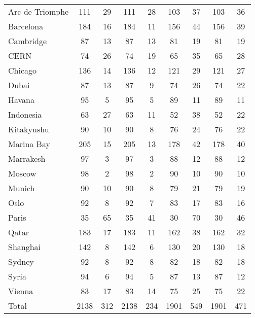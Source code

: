 \begin{table}[H]
\begin{adjustbox}{width=1\textwidth}
\begin{tabular}{|l|c|c|c|c|c|c|c|c|}
         Arc de Triomphe & 111  &  29  &  111  &  28  &  103  &  37  &  103  &  36  \\
    Barcelona       & 184  &  16  &  184  &  11  &  156  &  44  &  156  &  39  \\
    Cambridge       & 87  &  13  &  87  &  13  &  81  &  19  &  81  &  19  \\
    CERN            & 74  &  26  &  74  &  19  &  65  &  35  &  65  &  28  \\
    Chicago         & 136  &  14  &  136  &  12  &  121  &  29  &  121  &  27  \\ 
    Dubai           & 87  &  13  &  87  &  9  &  74  &  26  &  74  &  22  \\ 
    Havana          & 95  &  5  &  95  &  5  &  89  &  11  &  89  &  11  \\ 
    Indonesia       & 63  &  27  &  63  &  11  &  52  &  38  &  52  &  22  \\
    Kitakyushu      & 90  &  10  &  90  &  8  &  76  &  24  &  76  &  22  \\
    Marina Bay      & 205  &  15  &  205  &  13  &  178  &  42  &  178  &  40  \\ 
    Marrakesh       & 97  &  3  &  97  &  3  &  88  &  12  &  88  &  12  \\
    Moscow          & 98  &  2  &  98  &  2  &  90  &  10  &  90  &  10  \\
    Munich          & 90  &  10  &  90  &  8  &  79  &  21  &  79  &  19  \\
    Oslo            & 92  &  8  &  92  &  7  &  83  &  17  &  83  &  16  \\
    Paris           & 35  &  65  &  35  &  41  &  30  &  70  &  30  &  46  \\ 
    Qatar           & 183  &  17  &  183  &  11  &  162  &  38  &  162  &  32  \\
    Shanghai        & 142  &  8  &  142  &  6  &  130  &  20  &  130  &  18  \\
    Sydney          & 92  &  8  &  92  &  8  &  82  &  18  &  82  &  18  \\
    Syria           & 94  &  6  &  94  &  5  &  87  &  13  &  87  &  12  \\
    Vienna          & 83  &  17  &  83  &  14  &  75  &  25  &  75  &  22  \\ \hline
    Total           & 2138 & 312 & 2138 & 234 & 1901 & 549  & 1901 & 471 \\ \hline
 
    \end{tabular}
    \end{adjustbox}
\end{table}
